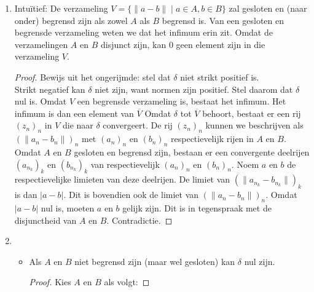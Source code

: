 \documentclass[main.tex]{subfiles}
\begin{document}
\begin{st}
  \begin{enumerate}
  \item
    \begin{klad}
      Intu\"itief: De verzameling $V = \{ \|a-b\| \mid a \in A, b \in B \}$ zal gesloten en (naar onder) begrensd zijn als zowel $A$ als $B$ begrensd is.
      Van een gesloten en begrensde verzameling weten we dat het infimum erin zit.
      Omdat de verzamelingen $A$ en $B$ disjunct zijn, kan $0$ geen element zijn in die verzameling $V$.
    \end{klad}
    \begin{proof}
      Bewijs uit het ongerijmde: stel dat $\delta$ niet strikt positief is.\\
      Strikt negatief kan $\delta$ niet zijn, want normen zijn positief.
      Stel daarom dat $\delta$ nul is.
      Omdat $V$ een begrensde verzameling is, bestaat het infimum.
      Het infimum is dan een element van $\overline{V}$\waarom
      Omdat $\delta$ tot $\overline{V}$ behoort, bestaat er een rij $(z_{n})_{n}$ in $V$ die naar $\delta$ convergeert.
      De rij $(z_{n})_{n}$ kunnen we beschrijven als $(\|a_{n}-b_{n}\|)_{n}$ met $(a_{n})_{n}$ en $(b_{n})_{n}$ respectievelijk rijen in $A$ en $B$.
      Omdat $A$ en $B$ gesloten en begrensd zijn, bestaan er een convergente deelrijen $(a_{n_{k}})_{k}$ en $(b_{n_{k}})_{k}$ van respectievelijk $(a_{n})_{n}$ en $(b_{n})_{n}$.
      Noem $a$ en $b$ de respectievelijke limieten van deze deelrijen.
      De limiet van $(\|a_{n_{k}}-b_{n_{k}}\|)_{k}$ is dan $|a-b|$.\waarom
      Dit is bovendien ook de limiet van $(\|a_{n}-b_{n}\|)_{n}$.
      Omdat $|a-b|$ nul is, moeten $a$ en $b$ gelijk zijn.
      Dit is in tegenspraak met de disjunctheid van $A$ en $B$.
      Contradictie.
    \end{proof}
  \item
    \begin{itemize}
    \item Als $A$ en $B$ niet begrensd zijn (maar wel gesloten) kan $\delta$ nul zijn.
      \begin{proof}
        Kies $A$ en $B$ als volgt:


\end{proof}
\end{itemize}
\end{enumerate}
\end{st}
\end{document}

